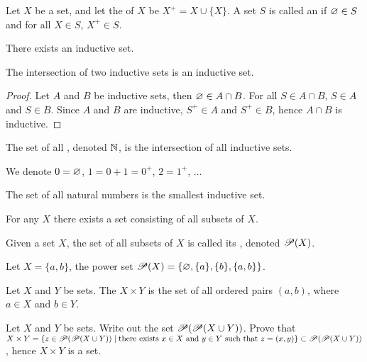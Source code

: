 \documentclass[10pt]{article}
\begin{document}
\begin{definition}
    Let $X$ be a set, and let the  of $X$ be ${X}^{+}=X\cup\{X\}$. A set $S$ is called an  if $\varnothing\in S$ and for all $X\in S$, ${X}^{+}\in S$.
\end{definition}
\begin{Axiom of infinity}
    There exists an inductive set.
\end{Axiom of infinity}
\begin{proposition}
    The intersection of two inductive sets is an inductive set.
\end{proposition}
\begin{proof}
    Let $A$ and $B$ be inductive sets, then $\varnothing\in A\cap B$. For all $S\in A\cap B$, $S\in A$ and $S\in B$. Since $A$ and $B$ are inductive, ${S}^{+}\in A$ and ${S}^{+}\in B$, hence $A\cap B$ is inductive.
\end{proof}
\par
\begin{definition}
    The set of all , denoted $\mathbb{N}$, is the intersection of all inductive sets. 
\end{definition}
\par
We denote $0=\varnothing$, $1=0+1={0}^{+}$, $2={1}^{+}$, $\dots$
\begin{problem}
    The set of all natural numbers is the smallest inductive set.
\end{problem}
\begin{Axiom of power set}
    For any $X$ there exists a set consisting of all subsets of $X$.
\end{Axiom of power set}
\begin{definition}
    Given a set $X$, the set of all subsets of $X$ is called its , denoted $\mathscr{P}(X)$.
\end{definition}
\begin{example}
    Let $X=\{a,b\}$, the power set $\mathscr{P}(X)=\{\varnothing,\{a\},\{b\},\{a,b\}\}$.
\end{example}
\begin{definition}
    Let $X$ and $Y$ be sets. The  $X\times Y$ is the set of all ordered pairs $(a,b)$, where $a\in X$ and $b\in Y$.
\end{definition}
\begin{problem}
    Let $X$ and $Y$ be sets. Write out the set $\mathscr{P}(\mathscr{P}(X\cup Y))$. Prove that $X\times Y=\{z\in\ps(\ps(X\cup Y))\mid\text{there exists}\ x\in X\ \text{and}\ y\in Y\ \text{such that}\ z=(x,y)\}\sub\ps(\ps(X\cup Y))$, hence $X\times Y$ is a set.
\end{problem}
\end{document}
